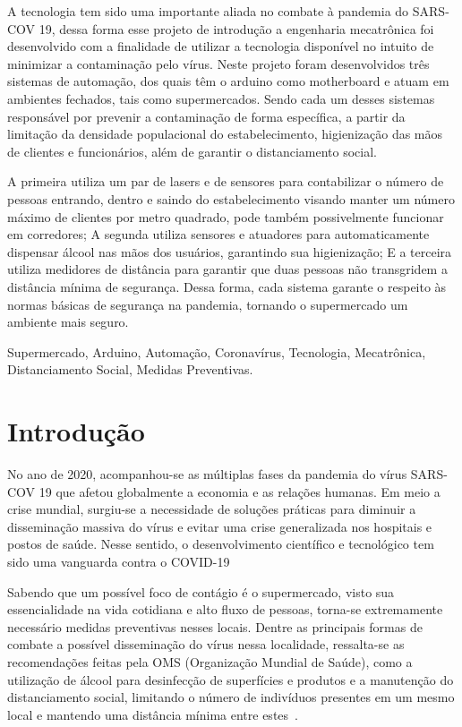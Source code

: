 \documentclass[10pt,twocolumn,letterpaper]{article}
\begin{document}
\begin{resumo}
A tecnologia tem sido uma importante aliada no combate à pandemia do SARS-COV 19, dessa forma esse projeto de introdução a engenharia mecatrônica foi desenvolvido com a finalidade de utilizar a tecnologia disponível no intuito de minimizar a contaminação pelo vírus. Neste projeto foram desenvolvidos três sistemas de automação, dos quais têm o arduino como motherboard e atuam em ambientes fechados, tais como supermercados. Sendo cada um desses sistemas responsável por prevenir a contaminação de forma específica, a partir da limitação da densidade populacional do estabelecimento,  higienização das mãos de clientes e funcionários, além de garantir o distanciamento social. 

A primeira utiliza um par de lasers e de sensores  para contabilizar o número de pessoas entrando, dentro e saindo do estabelecimento visando manter um número máximo de clientes por metro quadrado, pode também possivelmente funcionar em corredores; A segunda utiliza sensores e atuadores para automaticamente dispensar álcool nas mãos dos usuários, garantindo sua higienização; E a terceira utiliza medidores de distância para garantir que duas pessoas não transgridem a distância mínima de segurança. Dessa forma, cada sistema garante o respeito às normas básicas de segurança na pandemia, tornando o supermercado um ambiente mais seguro. 
 


\vskip 1mm%

{\noindent {}} Supermercado, Arduino, Automação, Coronavírus, Tecnologia, Mecatrônica, Distanciamento Social, Medidas Preventivas.
\end{resumo}

\section{Introdução}
No ano de 2020, acompanhou-se as múltiplas fases da pandemia do vírus SARS-COV 19 que afetou globalmente a economia e as relações humanas. Em meio a crise mundial, surgiu-se a necessidade de soluções práticas para diminuir a disseminação massiva do vírus e evitar uma crise generalizada nos hospitais e postos de saúde. Nesse sentido, o desenvolvimento científico e tecnológico tem sido uma vanguarda contra o COVID-19~\cite{1}

Sabendo que um possível foco de contágio é o supermercado, visto sua essencialidade na vida cotidiana e alto fluxo de pessoas, torna-se extremamente necessário medidas preventivas nesses locais.  Dentre as principais formas de combate a possível disseminação do vírus nessa localidade, ressalta-se as recomendações feitas pela OMS (Organização Mundial de Saúde), como a utilização de álcool para desinfecção de superfícies e produtos e a manutenção do distanciamento social, limitando o número de indivíduos presentes em um mesmo local e mantendo uma distância mínima entre estes~\cite{2}.
\end{document}
